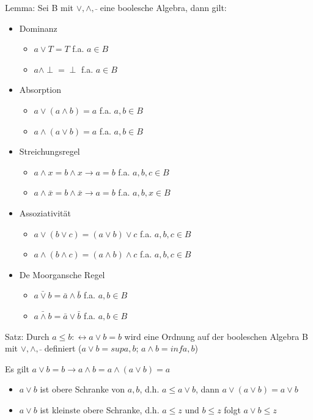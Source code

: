 \documentclass[10pt,landscape]{article}
\begin{document}
\begin{multicols}{3}
Lemma: Sei B mit $\vee, \wedge, \bar{}$ eine boolesche Algebra, dann gilt:
\begin{itemize}
    \item Dominanz
    \begin{itemize}
        \item $a\vee T = T$ f.a. $a\in B$
        \item $a\wedge \perp = \perp$ f.a. $a\in B$
    \end{itemize}
    \item Absorption
    \begin{itemize}
        \item $a\vee(a\wedge b)= a$ f.a. $a,b\in B$
        \item $a\wedge(a\vee b)= a$ f.a. $a,b\in B$
    \end{itemize}
    \item Streichungsregel
    \begin{itemize}
        \item $a\wedge x = b\wedge x \rightarrow a=b$ f.a. $a,b,c \in B$
        \item $a\wedge \bar{x} = b\wedge\bar{x} \rightarrow a=b$ f.a. $a,b,x \in B$
    \end{itemize}
    \item Assoziativität
    \begin{itemize}
        \item $a\vee(b\vee c)=(a\vee b)\vee c$ f.a. $a,b,c\in B$
        \item $a\wedge(b\wedge c)=(a\wedge b)\wedge c$ f.a. $a,b,c \in B$
    \end{itemize}
    \item De Moorgansche Regel
    \begin{itemize}
        \item $\bar{a\vee b} = \bar{a}\wedge \bar{b}$ f.a. $a,b\in B$
        \item $\bar{a\wedge b} = \bar{a}\vee \bar{b}$ f.a. $a,b\in B$
    \end{itemize}
\end{itemize}

Satz: Durch $a\leq b:\leftrightarrow a\vee b=b$ wird eine Ordnung auf der booleschen Algebra B mit $\vee, \wedge, \bar{}$ definiert ($a\vee b = sup{a,b}$; $a\wedge b = inf{a,b}$)

Es gilt $a\vee b= b \rightarrow a\wedge b = a\wedge(a\vee b)= a$
\begin{itemize}
    \item $a\vee b$ ist obere Schranke von ${a,b}$, d.h. $a\leq a\vee b$, dann $a\vee(a\vee b)=a\vee b$
    \item $a\vee b$ ist kleinste obere Schranke, d.h. $a\leq z$ und $b\leq z$ folgt $a\vee b \leq z$
\end{itemize}


\end{multicols}
\end{document}
